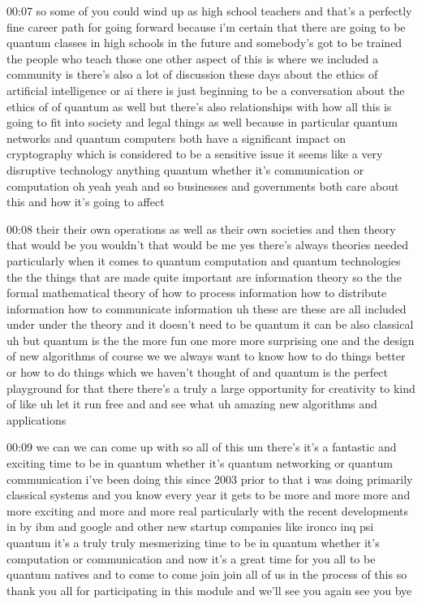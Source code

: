 00:07
so some of you could wind up as high school teachers and that's a perfectly fine
career path for going forward because i'm certain that there are going to be
quantum classes in high schools in the future and somebody's got to be
trained the people who teach those one other aspect
of this is where we included a community is there's also a lot of discussion
these days about the ethics of artificial intelligence or ai
there is just beginning to be a conversation about the ethics of of quantum
as well but there's also relationships with how all this is going to fit into
society and legal things as well because in particular quantum networks
and quantum computers both have a significant impact on
cryptography which is considered to be a sensitive issue
it seems like a very disruptive technology anything quantum whether it's
communication or computation oh yeah yeah and so businesses and governments
both care about this and how it's going to affect

00:08
their their own operations as well as their own societies
and then theory that would be you wouldn't that would be me yes
there's always theories needed particularly when it comes to quantum
computation and quantum technologies the the things that are made quite
important are information theory so the the formal mathematical theory of
how to process information how to distribute information
how to communicate information uh these are these are all included under under
the theory and it doesn't need to be quantum it can be also classical uh but
quantum is the the more fun one more more surprising one
and the design of new algorithms of course we we
always want to know how to do things better or how to do things which we
haven't thought of and quantum is the perfect playground for
that there there's a truly a large opportunity for creativity to kind of like
uh let it run free and and see what uh amazing new algorithms and applications

00:09
we can we can come up with so all of this um there's it's a
fantastic and exciting time to be in quantum whether it's quantum networking
or quantum communication i've been doing this since 2003
prior to that i was doing primarily classical systems
and you know every year it gets to be more and more
more and more exciting and more and more real particularly with the
recent developments in by ibm and google and other new startup
companies like ironco inq psi quantum it's a truly
truly mesmerizing time to be in quantum whether it's computation or
communication and now it's a great time for you all to
be quantum natives and to come to come join join
all of us in the process of this so thank you all for participating in this
module and we'll see you again see you bye


